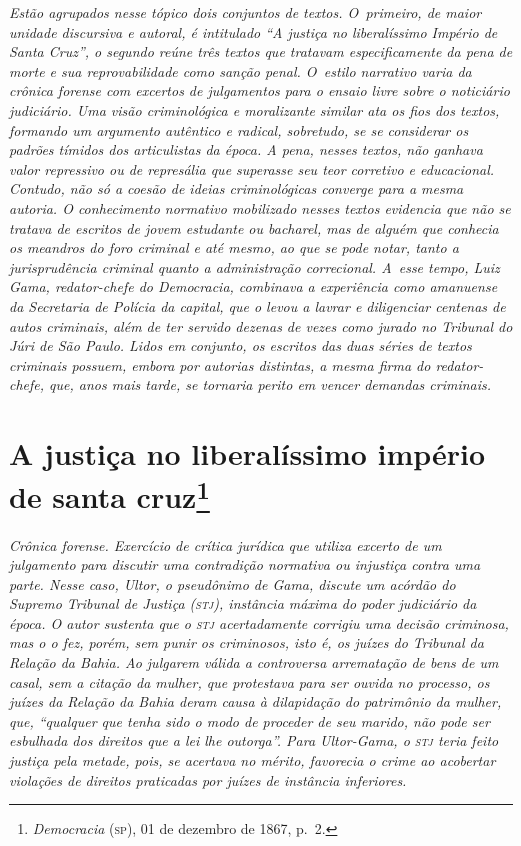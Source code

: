 \begin{argumento}\itshape
Estão agrupados nesse tópico dois conjuntos de textos. O~primeiro, de
maior unidade discursiva e autoral, é intitulado ``A justiça no
liberalíssimo Império de Santa Cruz'', o segundo reúne três textos
que tratavam especificamente da pena de morte e sua reprovabilidade como
sanção penal. O~estilo narrativo varia da crônica forense com excertos
de julgamentos para o ensaio livre sobre o noticiário judiciário. Uma
visão criminológica e moralizante similar ata os fios dos textos,
formando um argumento autêntico e radical, sobretudo, se se considerar
os padrões tímidos dos articulistas da época. A pena, nesses textos, não
ganhava valor repressivo ou de represália que superasse seu teor
corretivo e educacional. Contudo, não só a coesão de ideias
criminológicas converge para a mesma autoria. O conhecimento normativo
mobilizado nesses textos evidencia que não se tratava de escritos de
jovem estudante ou bacharel, mas de alguém que conhecia os meandros do
foro criminal e até mesmo, ao que se pode notar, tanto a jurisprudência
criminal quanto a administração correcional. A~esse tempo, Luiz Gama,
redator-chefe do \textnormal{Democracia}, combinava a experiência como
amanuense da Secretaria de Polícia da capital, que o levou a lavrar e
diligenciar centenas de autos criminais, além de ter servido dezenas de
vezes como jurado no Tribunal do Júri de São Paulo. Lidos em conjunto,
os escritos das duas séries de textos criminais possuem, embora por
autorias distintas, a mesma firma do redator-chefe, que, anos mais
tarde, se tornaria perito em vencer demandas criminais.
\end{argumento}

\chapter{A justiça no liberalíssimo império de santa cruz\footnote{\emph{Democracia} (\textsc{sp}), 01 de dezembro de 1867, p.~2.}}

\begin{didascalia}\itshape
Crônica forense. Exercício de crítica jurídica que utiliza excerto de um
julgamento para discutir uma contradição normativa ou injustiça contra
uma parte. Nesse caso, Ultor, o pseudônimo de Gama, discute um
acórdão do Supremo Tribunal de Justiça (\textsc{stj}), instância máxima do poder
judiciário da época. O autor sustenta que o \textsc{stj} acertadamente corrigiu
uma decisão criminosa, mas o o fez, porém, sem punir os criminosos, isto
é, os juízes do Tribunal da Relação da Bahia. Ao julgarem válida a
controversa arrematação de bens de um casal, sem a citação da mulher,
que protestava para ser ouvida no processo, os juízes da Relação da
Bahia deram causa à dilapidação do patrimônio da mulher, que, ``qualquer
que tenha sido o modo de proceder de seu marido, não pode ser esbulhada
dos direitos que a lei lhe outorga''. Para Ultor-Gama, o \textsc{stj} teria
feito justiça pela metade, pois, se acertava no mérito, favorecia o
crime ao acobertar violações de direitos praticadas por juízes de
instância inferiores.
\end{didascalia}



